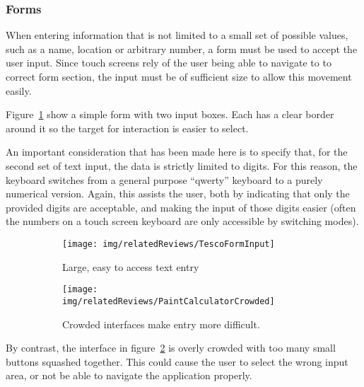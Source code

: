 
\subsubsection{Forms}
\label{ssub:forms}

When entering information that is not limited to a small set of possible
values, such as a name, location or arbitrary number, a form must be used to
accept the user input. Since touch screens rely of the user being able to
navigate to to correct form section, the input must be of sufficient size to
allow this movement easily.

Figure~\ref{fig:TescoFormInput} show a simple form with two input boxes. Each
has a clear border around it so the target for interaction is easier to select.

An important consideration that has been made here is to specify that, for the
second set of text input, the data is strictly limited to digits. For this
reason, the keyboard switches from a general purpose ``qwerty'' keyboard to a
purely numerical version. Again, this assists the user, both by indicating that
only the provided digits are acceptable, and making the input of those digits
easier (often the numbers on a touch screen keyboard are only accessible by
switching modes).
\begin{figure}[ht]
	\centering
	\begin{subfigure}[b]{0.2\textwidth}
		\texttt{[image: img/relatedReviews/TescoFormInput]}
		\caption{Large, easy to access text entry}\label{fig:TescoFormInput}
	\end{subfigure}%
	\qquad
	\begin{subfigure}[b]{0.25\textwidth}
		\texttt{[image: img/relatedReviews/PaintCalculatorCrowded]}
		\caption{Crowded interfaces make entry more difficult.}
	\end{subfigure}
	\caption{}\label{fig:PaintCalculatorCrowded}
\end{figure}

By contrast, the interface in figure~\ref{fig:PaintCalculatorCrowded} is overly
crowded with too many small buttons squashed together. This could cause the
user to select the wrong input area, or not be able to navigate the application
properly.

